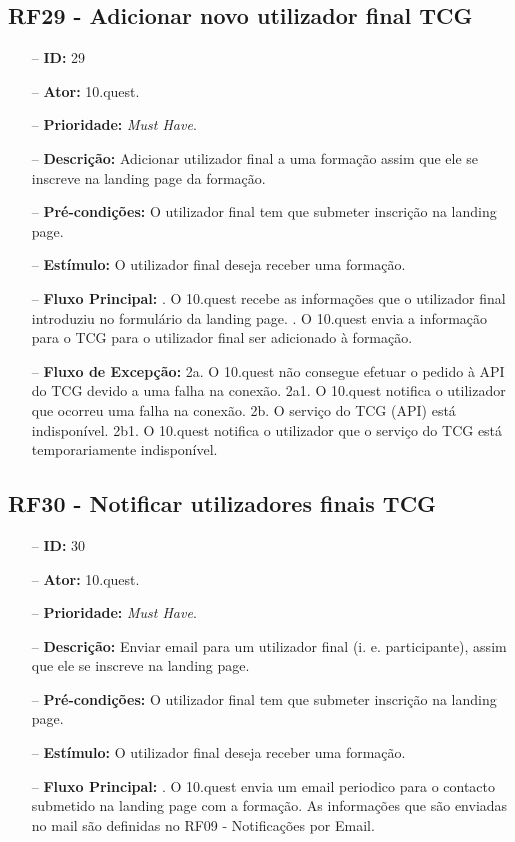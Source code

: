 \subsection{RF29 - Adicionar novo utilizador final TCG}
\begin{itemize}
	\item[--] \textbf{ID:} 29
	\item[--]  \textbf{Ator:} 10.quest.
	\item[--]  \textbf{Prioridade:} \textit{Must Have}.
	\item[--]  \textbf{Descrição:} Adicionar utilizador final a uma formação assim que ele se inscreve na landing page da formação.
	\item[--]  \textbf{Pré-condições:} O utilizador final tem que submeter inscrição na landing page.
	\item[--]  \textbf{Estímulo:} O utilizador final deseja receber uma formação.
	\item[--]  \textbf{Fluxo Principal:} 
	. O 10.quest recebe as informações que o utilizador final introduziu no formulário da landing page.
	. O 10.quest envia a informação para o TCG para o utilizador final ser adicionado à formação.
	\item[--]  \textbf{Fluxo de Excepção:} 
	\subitem 2a. O 10.quest não consegue efetuar o pedido à API do TCG devido a uma falha na conexão.
	\subitem 2a1. O 10.quest notifica o utilizador que ocorreu uma falha na conexão.
	\subitem 2b. O serviço do TCG (API) está indisponível.
	\subitem 2b1. O 10.quest notifica o utilizador que o serviço do TCG está temporariamente indisponível. 
\end{itemize}
\newpage

\subsection{RF30 - Notificar utilizadores finais TCG}
\begin{itemize}
	\item[--] \textbf{ID:} 30
	\item[--]  \textbf{Ator:} 10.quest.
	\item[--]  \textbf{Prioridade:} \textit{Must Have}.
	\item[--]  \textbf{Descrição:} Enviar email para um utilizador final (i. e. participante), assim que ele se inscreve na landing page.
	\item[--]  \textbf{Pré-condições:} O utilizador final tem que submeter inscrição na landing page.
	\item[--]  \textbf{Estímulo:} O utilizador final deseja receber uma formação.
	\item[--]  \textbf{Fluxo Principal:} 
	. O 10.quest envia um email periodico para o contacto submetido na landing page com a formação. As informações que são enviadas no mail são definidas no RF09 - Notificações por Email.
\end{itemize}
\newpage


